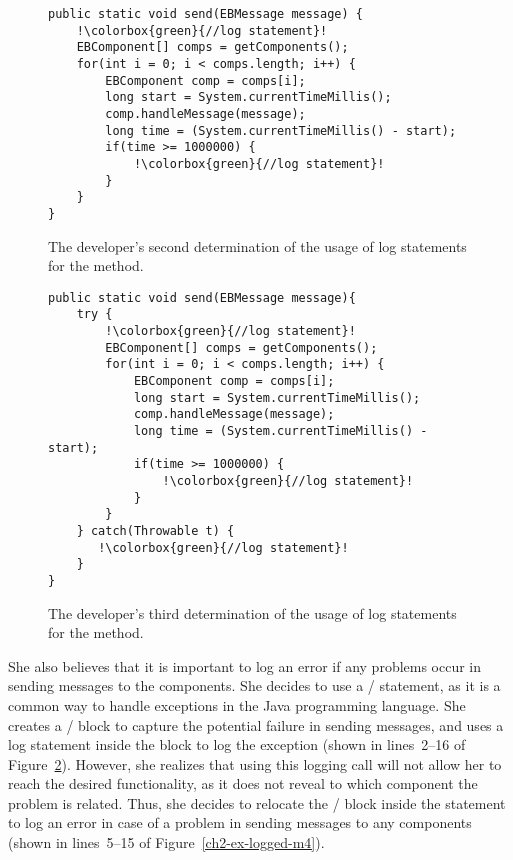 \begin{figure}[p]
\def\baselinestretch{1}
\begin{lstlisting}[escapechar=!]
public static void send(EBMessage message) {
    !\colorbox{green}{//log statement}!
    EBComponent[] comps = getComponents();
    for(int i = 0; i < comps.length; i++) {
        EBComponent comp = comps[i];
        long start = System.currentTimeMillis();
        comp.handleMessage(message);
        long time = (System.currentTimeMillis() - start);
        if(time >= 1000000) {
            !\colorbox{green}{//log statement}!
        }
    }
}
\end{lstlisting}
\caption[The developer's second determination of the usage of log statements.]{The developer's second determination of the usage of log statements for the  method.\label{ch2-ex-logged-m2}}
\end{figure}

\begin{figure}[p]
\def\baselinestretch{1}
\begin{lstlisting}[escapechar=!]
public static void send(EBMessage message){
    try {
        !\colorbox{green}{//log statement}!
        EBComponent[] comps = getComponents();
        for(int i = 0; i < comps.length; i++) {
            EBComponent comp = comps[i];
            long start = System.currentTimeMillis();
            comp.handleMessage(message);
            long time = (System.currentTimeMillis() - start);
            if(time >= 1000000) {
                !\colorbox{green}{//log statement}!
            }
        }
    } catch(Throwable t) {
       !\colorbox{green}{//log statement}!
    }
}
\end{lstlisting}
\caption[The developer's third determination of the usage of log statements.]{The developer's third determination of the usage of log statements for the  method.\label{ch2-ex-logged-m3}}
\end{figure}

She also believes that it is important to log an error if any problems occur in sending messages to the components. She decides to use a / statement, as it is a common way to handle exceptions in the Java programming language. She creates a / block to capture the potential failure in sending messages, and uses a log statement inside the  block to log the exception (shown in lines~2--16 of Figure~\ref{ch2-ex-logged-m3}). However, she realizes that using this logging call will not allow her to reach the desired functionality, as it does not reveal to which component the problem is related. Thus, she decides to relocate the / block inside the  statement to log an error in case of a problem in sending messages to any components (shown in lines~5--15 of Figure~\ref{ch2-ex-logged-m4}).


